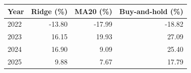 \begin{tabular}{lrrr}
\toprule
Year & Ridge (\%) & MA20 (\%) & Buy-and-hold (\%) \\
\midrule
2022 & -13.80 & -17.99 & -18.82 \\
2023 & 16.15 & 19.93 & 27.09 \\
2024 & 16.90 & 9.09 & 25.40 \\
2025 & 9.88 & 7.67 & 17.79 \\
\bottomrule
\end{tabular}
